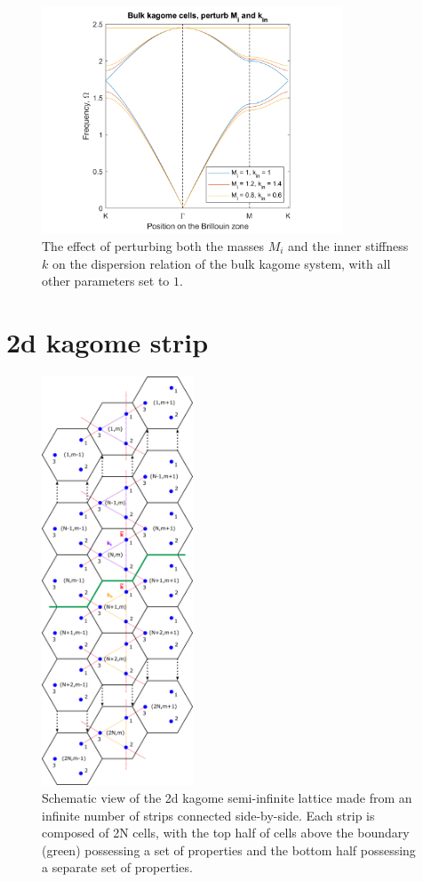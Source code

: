 \begin{figure}[!h]
\centering
\includegraphics[width=0.8\textwidth]{imgs/kagomeperturb2.png}
\caption{\label{fig:kagome2} The effect of perturbing both the masses $M_i$ and
  the inner stiffness $k$ on the dispersion relation of the bulk kagome system,
  with all other parameters set to $1$.}
\end{figure}

\section{2d kagome strip}

\begin{figure}[!h]
\centering
\includegraphics[width=0.4\textwidth]{imgs/kagomestripmodel.png}
\caption{\label{fig:kagomestripmodel} Schematic view of the 2d kagome
  semi-infinite lattice made from an infinite number of strips connected
  side-by-side. Each strip is composed of 2N cells, with the top half of cells
  above the boundary (green) possessing a set of properties and the bottom half
  possessing a separate set of properties.}
\end{figure}

